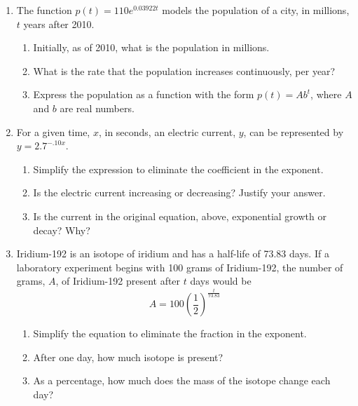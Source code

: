 \documentclass[12pt, oneside]{article}
\begin{document}
\begin{enumerate}


\item The function $p(t)=110e^{0.03922t}$ models the population of a city, in millions, $t$ years after 2010.
\begin{enumerate}
    \item Initially, as of 2010, what is the population in millions.\\[40pt]
    \item What is the rate that the population increases continuously, per year?\\[40pt]
    \item Express the population as a function with the form $p(t)=Ab^{t}$, where $A$ and $b$ are real numbers.\\[40pt]
\end{enumerate}

\item For a given time, $x$, in seconds, an electric current, $y$, can be represented by $y = 2.7^{-.10x}$. 
\begin{enumerate}
    \item Simplify the expression to eliminate the coefficient in the exponent.\\[40pt]
    \item Is the electric current increasing or decreasing? Justify your answer.\\[70pt]
    \item Is the current in the original equation, above, exponential growth or decay? Why?\\[70pt]
\end{enumerate}

\newpage

\item Iridium-192 is an isotope of iridium and has a half-life of 73.83 days. If a laboratory experiment begins with 100 grams of Iridium-192, the number of grams, $A$, of Iridium-192 present after $t$ days would be 
\[A=100 \left( \frac{1}{2} \right)^\frac{t}{73.83}\]

\begin{enumerate}
    \item Simplify the equation to eliminate the fraction in the exponent.\\[30pt]
    \item After one day, how much isotope is present?\\[30pt]
    \item As a percentage, how much does the mass of the isotope change each day?\\[30pt]
\end{enumerate}


\end{enumerate}
\end{document}
